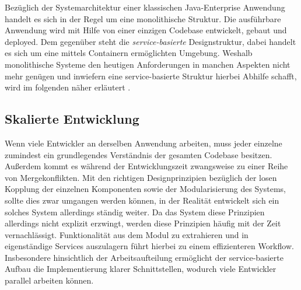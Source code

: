 



Bezüglich der Systemarchitektur einer klassischen Java-Enterprise Anwendung handelt es sich in der Regel um eine monolithische Struktur. Die ausführbare Anwendung wird mit Hilfe von einer einzigen Codebase entwickelt, gebaut und deployed. Dem gegenüber steht die \emph{service-basierte} Designstruktur, dabei handelt es sich um eine mittels Containern ermöglichten Umgebung. Weshalb monolithische Systeme den heutigen Anforderungen in manchen Aspekten nicht mehr genügen und inwiefern eine service-basierte Struktur hierbei Abhilfe schafft, wird im folgenden näher erläutert \cite[Seite~42 ff.]{continuous-delivery}.


\subsection{Skalierte Entwicklung}
Wenn viele Entwickler an derselben Anwendung arbeiten, muss jeder einzelne zumindest ein grundlegendes Verständnis der gesamten Codebase besitzen. Außerdem kommt es während der Entwicklungszeit zwangsweise zu einer Reihe von Mergekonflikten. Mit den richtigen Designprinzipien bezüglich der losen Kopplung der einzelnen Komponenten sowie der Modularisierung des Systems, sollte dies zwar umgangen werden können, in der Realität entwickelt sich ein solches System allerdings ständig weiter. Da das System diese Prinzipien allerdings nicht explizit erzwingt, werden diese Prinzipien häufig mit der Zeit vernachlässigt. Funktionalität aus dem Modul zu extrahieren und in eigenständige Services auszulagern führt hierbei zu einem effizienteren Workflow. Insbesondere hinsichtlich der Arbeitsaufteilung ermöglicht der service-basierte Aufbau die Implementierung klarer Schnittstellen, wodurch viele Entwickler parallel arbeiten können.


